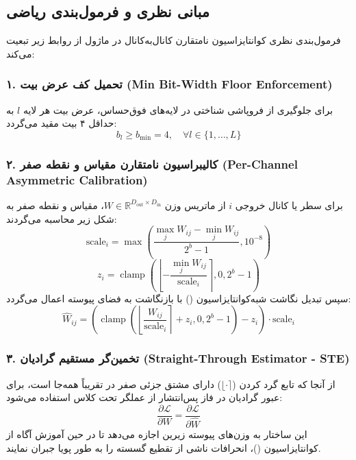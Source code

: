 \subsection{مبانی نظری و فرمول‌بندی ریاضی}
فرمول‌بندی نظری کوانتایزاسیون نامتقارن کانال‌به‌کانال در ماژول  از روابط زیر تبعیت می‌کند:

\subsubsection*{۱. تحمیل کف عرض بیت (Min Bit-Width Floor Enforcement)}
برای جلوگیری از فروپاشی شناختی در لایه‌های فوق‌حساس، عرض بیت هر لایه $l$ به حداقل ۴ بیت مقید می‌گردد:
\begin{equation}
b_l \ge b_{\min} = 4, \quad \forall l \in \{1, \dots, L\}
\end{equation}

\subsubsection*{۲. کالیبراسیون نامتقارن مقیاس و نقطه صفر (Per-Channel Asymmetric Calibration)}
برای سطر یا کانال خروجی $i$ از ماتریس وزن $W \in \mathbb{R}^{D_{\text{out}} \times D_{\text{in}}}$، مقیاس و نقطه صفر به شکل زیر محاسبه می‌گردند:
\begin{equation}
\text{scale}_i = \max\left( \frac{\max_j W_{ij} - \min_j W_{ij}}{2^b - 1}, 10^{-8} \right)
\end{equation}
\begin{equation}
z_i = \operatorname{clamp}\left( \left\lfloor -\frac{\min_j W_{ij}}{\text{scale}_i} \right\rceil, 0, 2^b - 1 \right)
\end{equation}
سپس تبدیل نگاشت شبه‌کوانتایزاسیون () با بازنگاشت به فضای پیوسته اعمال می‌گردد:
\begin{equation}
\widehat{W}_{ij} = \left( \operatorname{clamp}\left( \left\lfloor \frac{W_{ij}}{\text{scale}_i} \right\rceil + z_i, 0, 2^b - 1 \right) - z_i \right) \cdot \text{scale}_i
\end{equation}

\subsubsection*{۳. تخمین‌گر مستقیم گرادیان (Straight-Through Estimator - STE)}
از آنجا که تابع گرد کردن ($\lfloor \cdot \rceil$) دارای مشتق جزئی صفر در تقریباً همه‌جا است، برای عبور گرادیان در فاز پس‌انتشار از عملگر  تحت کلاس  استفاده می‌شود:
\begin{equation}
\frac{\partial \mathcal{L}}{\partial W} = \frac{\partial \mathcal{L}}{\partial \widehat{W}}
\end{equation}
این ساختار به وزن‌های پیوسته زیرین اجازه می‌دهد تا در حین آموزش آگاه از کوانتایزاسیون ()، انحرافات ناشی از تقطیع گسسته را به طور پویا جبران نمایند.

